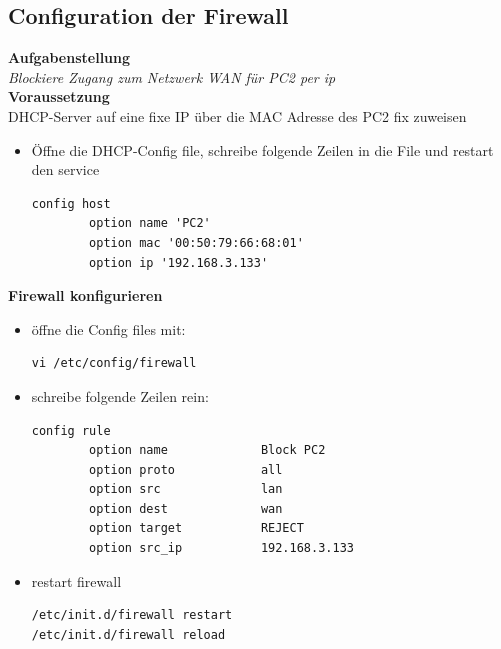 \documentclass[12pt, a4paper]{article}\usepackage{listings}
\begin{document}
\subsection{Configuration der Firewall}
\textbf{Aufgabenstellung}\\
\textit{Blockiere Zugang zum Netzwerk WAN für PC2 per ip}\\
\textbf{Voraussetzung}\\
DHCP-Server auf eine fixe IP über die MAC Adresse des PC2 fix zuweisen
\begin{itemize}
\item Öffne die DHCP-Config file, schreibe folgende Zeilen in die File und restart den service
\begin{verbatim}
config host
        option name 'PC2'
        option mac '00:50:79:66:68:01'
        option ip '192.168.3.133'
\end{verbatim}
\end{itemize}
\textbf{Firewall konfigurieren}
\begin{itemize}
\item öffne die Config files mit:
\begin{verbatim}
vi /etc/config/firewall
\end{verbatim}
\item schreibe folgende Zeilen rein:
\begin{verbatim}
config rule                                         
        option name             Block PC2           
        option proto            all                 
        option src              lan                 
        option dest             wan                 
        option target           REJECT              
        option src_ip           192.168.3.133  
\end{verbatim}
\item restart firewall
\begin{verbatim}
/etc/init.d/firewall restart
/etc/init.d/firewall reload
\end{verbatim}
\end{itemize}
\end{document}
